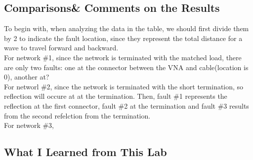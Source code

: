 \documentclass[11pt,oneside,a4paper]{report}
\begin{document}
\subsection*{Comparisons\& Comments on the Results}
To begin with, when analyzing the data in the table, we should first divide them by 2 to indicate the fault location, since they represent the total distance for a wave to travel forward and backward.\\
For network \#1, since the network is terminated with the matched load, there are only two faults: one at the connector between the VNA and cable(location is 0), another at?\\
For networl \#2, since the network is terminated with the short termination, so reflection will occure at at the termination. Then, fault \#1 represents the reflection at the first connector, fault \#2 at the termination and fault \#3 results from the second refelction from the termination.\\
For network \#3, \\
\subsection*{What I Learned from This Lab}
\end{document}
